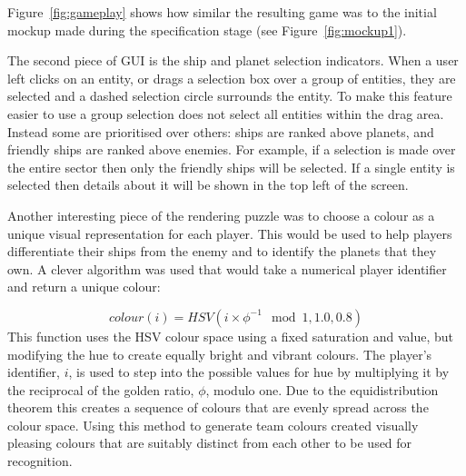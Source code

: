Figure~\ref{fig:gameplay} shows how similar the resulting game was to the initial mockup made during the specification stage (see Figure~\ref{fig:mockup1}).

The second piece of GUI is the ship and planet selection indicators. When a user left clicks on an entity, or drags a selection box over a group of entities, they are selected and a dashed selection circle surrounds the entity. To make this feature easier to use a group selection does not select all entities within the drag area. Instead some are prioritised over others: ships are ranked above planets, and friendly ships are ranked above enemies. For example, if a selection is made over the entire sector then only the friendly ships will be selected. If a single entity is selected then details about it will be shown in the top left of the screen.


Another interesting piece of the rendering puzzle was to choose a colour as a unique visual representation for each player. This would be used to help players differentiate their ships from the enemy and to identify the planets that they own. A clever algorithm was used that would take a numerical player identifier and return a unique colour:\cite{ankerl2009}

\begin{equation*}
	colour(i) = HSV(i \times \phi^{-1} \mod 1, 1.0, 0.8)
\end{equation*}
\noindent
This function uses the HSV colour space using a fixed saturation and value, but modifying the hue to create equally bright and vibrant colours. The player's identifier, $i$, is used to step into the possible values for hue by multiplying it by the reciprocal of the golden ratio, $\phi$, modulo one. Due to the equidistribution theorem this creates a sequence of colours that are evenly spread across the colour space. Using this method to generate team colours created visually pleasing colours that are suitably distinct from each other to be used for recognition.
